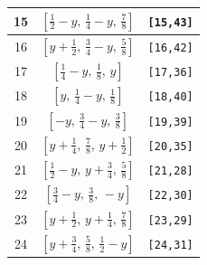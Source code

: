 \documentclass[fleqn,8pt]{jsarticle}
\begin{document}
\begin{longtable}{ccc}
15 & $\left[ \frac{1}{2} - y,\, \frac{1}{4} - y,\, \frac{7}{8} \right]$ & {\tt [15,43]} \\ \hline
16 & $\left[ y + \frac{1}{2},\, \frac{3}{4} - y,\, \frac{5}{8} \right]$ & {\tt [16,42]} \\ \hline
17 & $\left[ \frac{1}{4} - y,\, \frac{1}{8},\, y \right]$ & {\tt [17,36]} \\ \hline
18 & $\left[ y,\, \frac{1}{4} - y,\, \frac{1}{8} \right]$ & {\tt [18,40]} \\ \hline
19 & $\left[ - y,\, \frac{3}{4} - y,\, \frac{3}{8} \right]$ & {\tt [19,39]} \\ \hline
20 & $\left[ y + \frac{1}{4},\, \frac{7}{8},\, y + \frac{1}{2} \right]$ & {\tt [20,35]} \\ \hline
21 & $\left[ \frac{1}{2} - y,\, y + \frac{3}{4},\, \frac{5}{8} \right]$ & {\tt [21,28]} \\ \hline
22 & $\left[ \frac{3}{4} - y,\, \frac{3}{8},\, - y \right]$ & {\tt [22,30]} \\ \hline
23 & $\left[ y + \frac{1}{2},\, y + \frac{1}{4},\, \frac{7}{8} \right]$ & {\tt [23,29]} \\ \hline
24 & $\left[ y + \frac{3}{4},\, \frac{5}{8},\, \frac{1}{2} - y \right]$ & {\tt [24,31]} \\
\end{longtable}
\renewcommand{\arraystretch}{1.2}
\end{document}
